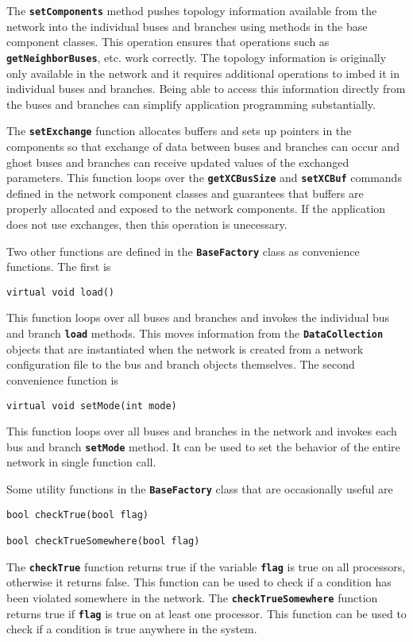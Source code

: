 The \texttt{\textbf{setComponents}} method pushes topology information available from the network into the individual buses and branches using methods in the base component classes. This operation ensures that operations such as \texttt{\textbf{getNeighborBuses}}, etc. work correctly. The topology information is originally only available in the network and it requires additional operations to imbed it in individual buses and branches. Being able to access this information directly from the buses and branches can simplify application programming substantially.

The \texttt{\textbf{setExchange}} function allocates buffers and sets up
pointers in the components so that exchange of data between buses and branches
can occur and ghost buses and branches can receive updated values of the
exchanged parameters. This function loops over the
\texttt{\textbf{getXCBusSize}} and \texttt{\textbf{setXCBuf}} commands defined
in the network component classes and guarantees that buffers are properly
allocated and exposed to the network components. If the application does not use
exchanges, then this operation is unecessary.

Two other functions are defined in the \texttt{\textbf{BaseFactory}} class as convenience functions. The first is

{
\color{red}
\begin{Verbatim}[fontseries=b]
virtual void load()
\end{Verbatim}
}

This function loops over all buses and branches and invokes the individual bus and branch \texttt{\textbf{load}} methods. This moves information from the \texttt{\textbf{DataCollection}} objects that are instantiated when the network is created from a network configuration file to the bus and branch objects themselves. The second convenience function is

{
\color{red}
\begin{Verbatim}[fontseries=b]
virtual void setMode(int mode)
\end{Verbatim}
}

This function loops over all buses and branches in the network and invokes each bus and branch \texttt{\textbf{setMode}} method. It can be used to set the behavior of the entire network in single function call.

Some utility functions in the \texttt{\textbf{BaseFactory}} class that are occasionally useful are

{
\color{red}
\begin{Verbatim}[fontseries=b]
bool checkTrue(bool flag)

bool checkTrueSomewhere(bool flag)
\end{Verbatim}
}

The \texttt{\textbf{checkTrue}} function returns true if the variable \texttt{\textbf{flag}} is true on all processors, otherwise it returns false. This function can be used to check if a condition has been violated somewhere in the network. The \texttt{\textbf{checkTrueSomewhere}} function returns true if \texttt{\textbf{flag}} is true on at least one processor. This function can be used to check if a condition is true anywhere in the system.
